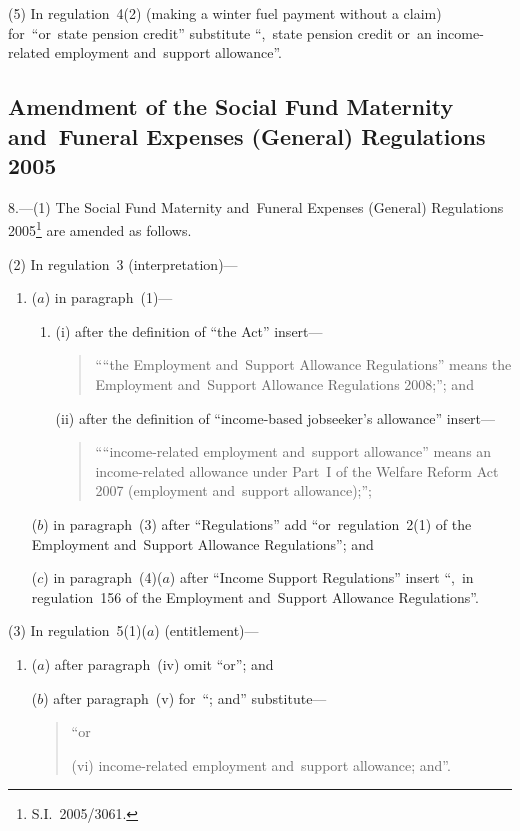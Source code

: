 \documentclass[12pt,a4paper]{article}
\begin{document}
(5) In regulation~4(2) (making a winter fuel payment without a claim) for~“or~state pension credit” substitute “,~state pension credit or~an income-related employment and~support allowance”.

\subsection[8. Amendment of the Social Fund Maternity and~Funeral Expenses (General) Regulations 2005]{Amendment of the Social Fund Maternity and~Funeral Expenses (General) Regulations 2005}

8.---(1)  The Social Fund Maternity and~Funeral Expenses (General) Regulations 2005\footnote{S.I.~2005/3061.} are amended as follows.

(2) In regulation~3 (interpretation)—
\begin{enumerate}\item[]
($a$) in paragraph~(1)—
\begin{enumerate}\item[]
(i) after the definition of “the Act” insert—
\begin{quotation}
““the Employment and~Support Allowance Regulations” means the Employment and~Support Allowance Regulations 2008;”; and
\end{quotation}

(ii) after the definition of “income-based jobseeker’s allowance” insert—
\begin{quotation}
““income-related employment and~support allowance” means an income-related allowance under Part~I of the Welfare Reform Act 2007 (employment and~support allowance);”;
\end{quotation}
\end{enumerate}

($b$) in paragraph~(3) after “Regulations” add “or~regulation~2(1) of the Employment and~Support Allowance Regulations”; and

($c$) in paragraph~(4)($a$)  after “Income Support Regulations” insert “,~in regulation~156 of the Employment and~Support Allowance Regulations”.
\end{enumerate}

(3) In regulation~5(1)($a$)  (entitlement)—
\begin{enumerate}\item[]
($a$) after paragraph~(iv)  omit “or”; and

($b$) after paragraph~(v)  for~“; and” substitute—
\begin{quotation}
“or

(vi) income-related employment and~support allowance; and”.
\end{quotation}
\end{enumerate}
\end{document}
